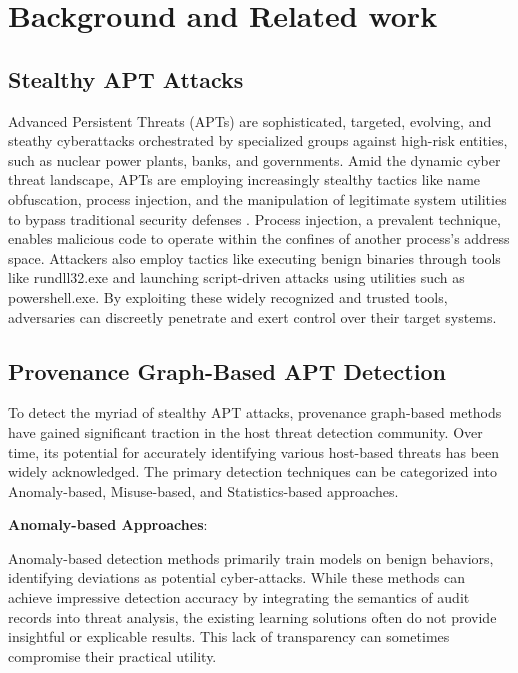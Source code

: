\section{Background and Related work}

\subsection{Stealthy APT Attacks}

Advanced Persistent Threats (APTs) are sophisticated, targeted, evolving, and steathy cyberattacks orchestrated by specialized groups against high-risk entities, such as nuclear power plants, banks, and governments. Amid the dynamic cyber threat landscape, APTs are employing increasingly stealthy tactics like name obfuscation, process injection, and the manipulation of legitimate system utilities to bypass traditional security defenses \cite{barr2021survivalism}. Process injection, a prevalent technique, enables malicious code to operate within the confines of another process's address space. Attackers also employ tactics like executing benign binaries through tools like rundll32.exe and launching script-driven attacks using utilities such as powershell.exe. By exploiting these widely recognized and trusted tools, adversaries can discreetly penetrate and exert control over their target systems.

\subsection{Provenance Graph-Based APT Detection}
To detect the myriad of stealthy APT attacks, provenance graph-based methods have gained significant traction in the host threat detection community. Over time, its potential for accurately identifying various host-based threats has been widely acknowledged. The primary detection techniques can be categorized into Anomaly-based, Misuse-based, and Statistics-based approaches.

\textbf{Anomaly-based Approaches}:

Anomaly-based detection methods primarily train models on benign behaviors, identifying deviations as potential cyber-attacks. While these methods can achieve impressive detection accuracy by integrating the semantics of audit records into threat analysis, the existing learning solutions often do not provide insightful or explicable results. This lack of transparency can sometimes compromise their practical utility.

